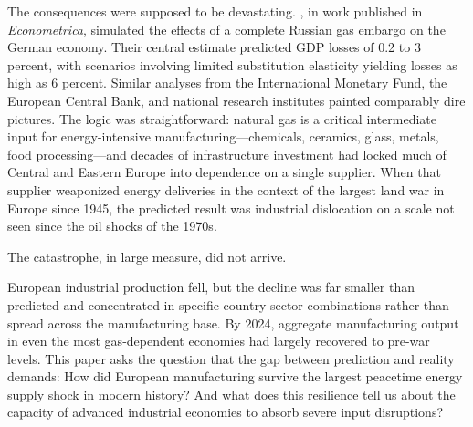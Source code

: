 \documentclass[12pt]{article}
\begin{document}
The consequences were supposed to be devastating. \citet{bachmann2022}, in work published in \textit{Econometrica}, simulated the effects of a complete Russian gas embargo on the German economy. Their central estimate predicted GDP losses of 0.2 to 3 percent, with scenarios involving limited substitution elasticity yielding losses as high as 6 percent. Similar analyses from the International Monetary Fund, the European Central Bank, and national research institutes painted comparably dire pictures. The logic was straightforward: natural gas is a critical intermediate input for energy-intensive manufacturing---chemicals, ceramics, glass, metals, food processing---and decades of infrastructure investment had locked much of Central and Eastern Europe into dependence on a single supplier. When that supplier weaponized energy deliveries in the context of the largest land war in Europe since 1945, the predicted result was industrial dislocation on a scale not seen since the oil shocks of the 1970s.

The catastrophe, in large measure, did not arrive.

European industrial production fell, but the decline was far smaller than predicted and concentrated in specific country-sector combinations rather than spread across the manufacturing base. By 2024, aggregate manufacturing output in even the most gas-dependent economies had largely recovered to pre-war levels. This paper asks the question that the gap between prediction and reality demands: How did European manufacturing survive the largest peacetime energy supply shock in modern history? And what does this resilience tell us about the capacity of advanced industrial economies to absorb severe input disruptions?
\end{document}
